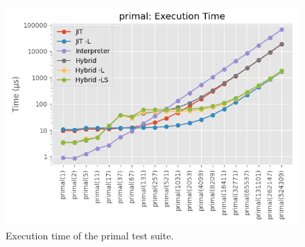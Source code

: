 \begin{figure}[H]
    \centering
    \includegraphics[scale=0.75]{output/graphs/tests/all/primal/time.png}
    \caption{Execution time of the primal test suite.}
    \label{figure:primal-time}
\end{figure}